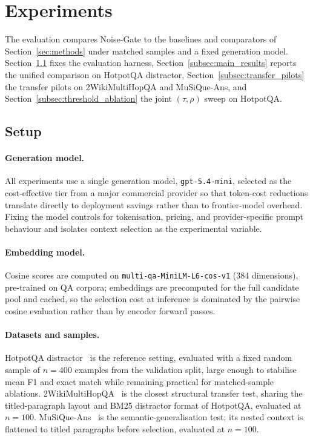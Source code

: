 \documentclass[runningheads]{llncs}
\begin{document}
\section{Experiments}
\label{sec:experiments}

The evaluation compares Noise-Gate to the baselines and comparators of Section~\ref{sec:methods} under matched samples and a fixed generation model. Section~\ref{subsec:setup} fixes the evaluation harness, Section~\ref{subsec:main_results} reports the unified comparison on HotpotQA distractor, Section~\ref{subsec:transfer_pilots} the transfer pilots on 2WikiMultiHopQA and MuSiQue-Ans, and Section~\ref{subsec:threshold_ablation} the joint $(\tau,\rho)$ sweep on HotpotQA.

\subsection{Setup}
\label{subsec:setup}

\paragraph{Generation model.} All experiments use a single generation model, \texttt{gpt-5.4-mini}, selected as the cost-effective tier from a major commercial provider so that token-cost reductions translate directly to deployment savings rather than to frontier-model overhead. Fixing the model controls for tokenisation, pricing, and provider-specific prompt behaviour and isolates context selection as the experimental variable.

\paragraph{Embedding model.} Cosine scores are computed on \texttt{multi-qa-MiniLM-L6-cos-v1} (384 dimensions), pre-trained on QA corpora; embeddings are precomputed for the full candidate pool and cached, so the selection cost at inference is dominated by the pairwise cosine evaluation rather than by encoder forward passes.

\paragraph{Datasets and samples.} HotpotQA distractor~\cite{yang2018hotpotqa} is the reference setting, evaluated with a fixed random sample of $n{=}400$ examples from the validation split, large enough to stabilise mean F1 and exact match while remaining practical for matched-sample ablations. 2WikiMultiHopQA~\cite{ho-etal-2020-constructing} is the closest structural transfer test, sharing the titled-paragraph layout and BM25 distractor format of HotpotQA, evaluated at $n{=}100$. MuSiQue-Ans~\cite{trivedi-etal-2022-musique} is the semantic-generalisation test; its nested context is flattened to titled paragraphs before selection, evaluated at $n{=}100$.
\end{document}
